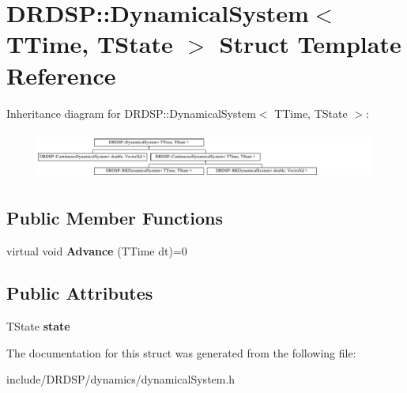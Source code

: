 \hypertarget{struct_d_r_d_s_p_1_1_dynamical_system}{\section{D\-R\-D\-S\-P\-:\-:Dynamical\-System$<$ T\-Time, T\-State $>$ Struct Template Reference}
\label{struct_d_r_d_s_p_1_1_dynamical_system}
}
Inheritance diagram for D\-R\-D\-S\-P\-:\-:Dynamical\-System$<$ T\-Time, T\-State $>$\-:\begin{figure}[H]
\begin{center}
\leavevmode
\includegraphics[height=1.577465cm]{struct_d_r_d_s_p_1_1_dynamical_system}
\end{center}
\end{figure}
\subsection*{Public Member Functions}
\begin{DoxyCompactItemize}
\item 
\hypertarget{struct_d_r_d_s_p_1_1_dynamical_system_ab877e883970210e09051f389203fb3e4}{virtual void {\bfseries Advance} (T\-Time dt)=0}\label{struct_d_r_d_s_p_1_1_dynamical_system_ab877e883970210e09051f389203fb3e4}

\end{DoxyCompactItemize}
\subsection*{Public Attributes}
\begin{DoxyCompactItemize}
\item 
\hypertarget{struct_d_r_d_s_p_1_1_dynamical_system_a31ddd60e00edcbe16c980e302b7752de}{T\-State {\bfseries state}}\label{struct_d_r_d_s_p_1_1_dynamical_system_a31ddd60e00edcbe16c980e302b7752de}

\end{DoxyCompactItemize}


The documentation for this struct was generated from the following file\-:\begin{DoxyCompactItemize}
\item 
include/\-D\-R\-D\-S\-P/dynamics/dynamical\-System.\-h\end{DoxyCompactItemize}

